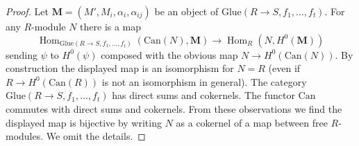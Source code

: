 \documentclass[10pt,a4paper]{amsart}
\theoremstyle{plain}
\theoremstyle{definition}
\theoremstyle{remark}
\numberwithin{equation}{subsection}
\def\Hom{\mathop{\mathrm{Hom}}\nolimits}
\begin{document}
\begin{proof}
Let $\mathbf{M} = (M', M_i, \alpha_i, \alpha_{ij})$ be an object of
$\text{Glue}(R \to S, f_1, \ldots, f_t)$. For any $R$-module $N$ there is
a map
$$
\Hom_{\text{Glue}(R \to S, f_1, \ldots, f_t)}(\text{Can}(N), \mathbf{M})
\to
\Hom_R(N, H^0(\mathbf{M}))
$$
sending $\psi$ to $H^0(\psi)$ composed with the obvious map
$N \to H^0(\text{Can}(N))$. By construction the displayed map is an isomorphism
for $N = R$ (even if $R \to H^0(\text{Can}(R))$ is not an isomorphism
in general). The category $\text{Glue}(R \to S, f_1, \ldots, f_t)$ has
direct sums and cokernels. The functor $\text{Can}$ commutes with direct sums
and cokernels. From these observations we find the displayed map is bijective
by writing $N$ as a cokernel of a map between free $R$-modules.
We omit the details.
\end{proof}
\end{document}

